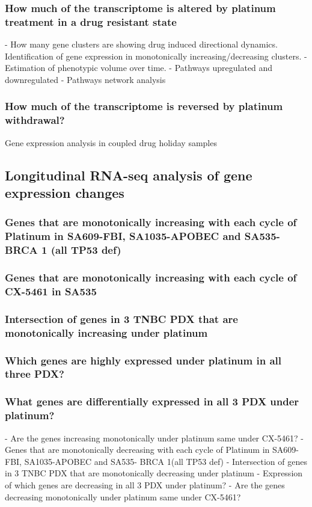 \documentclass{nature}
\begin{document}
\subsubsection{How much of the transcriptome is altered by platinum treatment in a drug resistant state}
- How many gene clusters are showing drug induced directional dynamics.
Identification of gene expression in monotonically increasing/decreasing clusters.
- Estimation of phenotypic volume over time.
- Pathways upregulated and downregulated
- Pathways network analysis
\subsubsection{How much of the transcriptome is reversed by platinum withdrawal?}
Gene expression analysis in coupled drug holiday samples

\subsection{Longitudinal RNA-seq analysis of gene expression changes}


\subsubsection{Genes that are monotonically increasing with each cycle of Platinum in SA609-FBI, SA1035-APOBEC and SA535- BRCA 1 (all TP53 def)}

\subsubsection{Genes that are monotonically increasing with each cycle of CX-5461 in SA535}


\subsubsection{Intersection of genes in 3 TNBC PDX that are monotonically increasing under platinum}


\subsubsection{Which genes are highly expressed under platinum in all three PDX?}

\subsubsection{What genes are differentially expressed in all 3 PDX under platinum?}
- Are the genes increasing monotonically under platinum same under CX-5461?
- Genes that are monotonically decreasing with each cycle of Platinum in SA609-FBI, SA1035-APOBEC and SA535- BRCA 1(all TP53 def)
- Intersection of genes in 3 TNBC PDX that are monotonically decreasing under platinum 
- Expression of which genes are decreasing in all 3 PDX under platinum? - Are the genes decreasing monotonically under platinum same under CX-5461?
\end{document}
